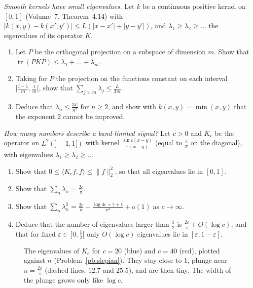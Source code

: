 \begin{exercise}[$\star\star\star$]\label{pb:eigendecay}
\emph{Smooth kernels have small eigenvalues.} Let $k$ be a continuous positive kernel on $[0,1]$ (Volume~7, Theorem~4.14) with $|k(x,y)-k(x',y')|\le L(|x-x'|+|y-y'|)$, and
$\lambda_1\ge\lambda_2\ge\dots$ the eigenvalues of its operator $K$.
\begin{enumerate}[label=(\alph*)]
\item Let $P$ be the orthogonal projection on a subspace of dimension $m$. Show that $\operatorname{tr}(PKP)\le\lambda_1+\dots+\lambda_m$.
\item Taking for $P$ the projection on the functions constant on each interval $[\frac{i-1}m,\frac im[$, show that $\sum_{j>m}\lambda_j\le\frac L{3m}$.
\item Deduce that $\lambda_n\le\frac{3L}{n^2}$ for $n\ge2$, and show with $k(x,y)=\min(x,y)$ that the exponent $2$ cannot be improved.
\end{enumerate}
\end{exercise}

\begin{exercise}[$\star\star\star$]\label{pb:slepian}
\emph{How many numbers describe a band-limited signal?} Let $c>0$ and $K_c$ be the operator on $L^2(]-1,1[)$ with kernel $\frac{\sin c(x-y)}{\pi(x-y)}$ (equal to $\frac c\pi$ on the diagonal),
with eigenvalues $\lambda_1\ge\lambda_2\ge\dots$
\begin{enumerate}[label=(\alph*)]
\item Show that $0\le\langle K_cf,f\rangle\le\|f\|_2^2$, so that all eigenvalues lie in $[0,1]$.
\item Show that $\sum_n\lambda_n=\frac{2c}\pi$.
\item Show that $\sum_n\lambda_n^2=\frac{2c}\pi-\frac{\log4c+\gamma+1}{\pi^2}+o(1)$ as $c\to\infty$.
\item Deduce that the number of eigenvalues larger than $\frac12$ is $\frac{2c}\pi+O(\log c)$, and that for fixed $\varepsilon\in\,]0,\frac12[$ only $O(\log c)$ eigenvalues lie in $[\varepsilon,1-\varepsilon]$.
\end{enumerate}
\end{exercise}

\begin{figure}[ht]
\centering
{}
\caption{The eigenvalues of $K_c$ for $c=20$ (blue) and $c=40$ (red), plotted against $n$ (Problem~\ref{pb:slepian}). They stay close to $1$, plunge near $n=\frac{2c}\pi$ (dashed lines,
$12.7$ and $25.5$), and are then tiny. The width of the plunge grows only like $\log c$.}\label{fig:slepian}
\end{figure}

